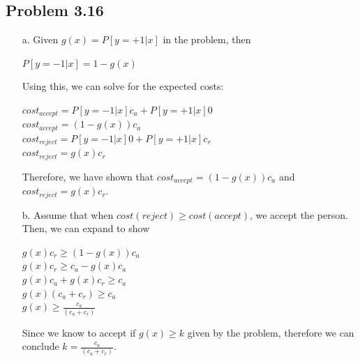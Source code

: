 \documentclass{homework}
\begin{document}
\subsection{Problem 3.16} 
\begin{itemize}
    \item[a.] Given \(g(x) = P[y = +1|x]\) in the problem, then
    \begin{center}
        \(P[y = -1|x] = 1 - g(x)\)
    \end{center}
    Using this, we can solve for the expected costs:
    \begin{center}
        \(cost_{accept} = P[y = -1|x]c_a + P[y = +1|x]0\) \\
        \(cost_{accept} = (1 - g(x))c_a\)\\

        \(cost_{reject} = P[y = -1|x]0+ P[y = +1|x]c_r\) \\
        \(cost_{reject} = g(x)c_r\)
    \end{center}
    Therefore, we have shown that \(cost_{accept} = (1 - g(x))c_a\) and \(cost_{reject} = g(x)c_r\). 

    \item[b.] Assume that when \(cost(reject) \geq cost(accept)\), we accept the person. Then, we can expand to show
    \begin{center}
        \(g(x)c_r \geq (1 - g(x))c_a\) \\
        \(g(x)c_r \geq c_a - g(x)c_a\) \\
        \(g(x)c_a + g(x)c_r \geq c_a\) \\
        \(g(x)(c_a + c_r) \geq c_a\) \\
        \(g(x) \geq \frac{c_a}{(c_a + c_r)}\)
    \end{center}
    Since we know to accept if \(g(x) \geq k\) given by the problem, therefore we can conclude \(k = \frac{c_a}{(c_a + c_r)}\). 
    

\end{itemize}
\end{document}
